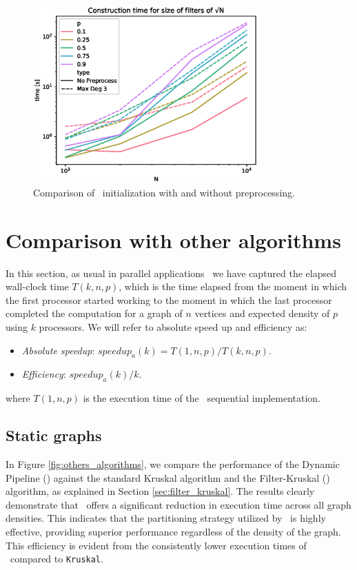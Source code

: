     \begin{figure}[H]
    \begin{center}
        \includegraphics[width=0.77\textwidth]{figures/preprocess.eps}
    \end{center}
    \caption{Comparison of \DPmst\ initialization with and without preprocessing. \label{fig:preprocess}}
    \end{figure}
    
\section{Comparison with other algorithms}
    In this section, as usual in parallel applications~\cite{bader2002algorithm} we have captured  the elapsed wall-clock time $T(k,n,p)$, which is the time elapsed from the moment in which the first processor started working to the moment in which the last processor completed the computation for a graph of  $n$ vertices and expected density of $p$ using $k$ processors. We will refer to absolute speed up and efficiency as: 
    \begin{itemize}
        \setlength\itemsep{-0.5em}
        \item \textit{Absolute speedup}: $speedup_a(k) = T(1, n, p)/T(k, n, p)$.
        \item \textit{Efficiency}: $speedup_a(k)/k$.
    \end{itemize} 
    where $T(1, n, p)$ is the execution time of the \mst\ sequential implementation.
    
    \subsection*{Static graphs}
        In Figure \ref{fig:others_algorithms}, we compare the performance of the Dynamic Pipeline (\DPmst) against the standard Kruskal algorithm and the Filter-Kruskal (\FKruskal) algorithm, as explained in Section \ref{sec:filter_kruskal}. The results clearly demonstrate that \DPmst\ offers a significant reduction in execution time across all graph densities. This indicates that the partitioning strategy utilized by \DPmst\ is highly effective, providing superior performance regardless of the density of the graph. This efficiency is evident from the consistently lower execution times of \DPmst\ compared to {\tt Kruskal}.
    
